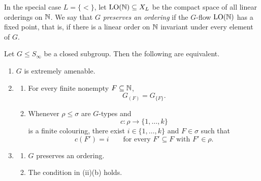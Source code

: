 In the special case \(L=\{<\}\), let \(\operatorname{LO}(\mathbb{N})\subseteq X_L\) be the compact space of all linear orderings on \(\mathbb{N}\). We say that \(G\) \emph{preserves an ordering} if the \(G\)-flow \(\operatorname{LO}(\mathbb{N})\) has a fixed point, that is, if there is a linear order on \(\mathbb{N}\) invariant under every element of \(G\).
\begin{proposition}
    \label{prop:type-characterization}
    Let \(G\leq S_\infty\) be a closed subgroup. Then the following are equivalent.
    \begin{enumerate}
        \item[(i)] \(G\) is extremely amenable.
        \item[(ii)]
              \begin{enumerate}
                  \item[(a)] For every finite nonempty \(F\subseteq\mathbb{N}\),
                        \[
                            G_{(F)}=G_{\{F\}}.
                        \]
                  \item[(b)] Whenever \(\rho\leq \sigma\) are \(G\)-types and
                        \[
                            c\colon \rho\to\{1,\dots,k\}
                        \]
                        is a finite colouring, there exist \(i\in\{1,\dots,k\}\) and \(F\in \sigma\) such that
                        \[
                            c(F')=i
                            \qquad\text{for every } F'\subseteq F \text{ with } F'\in \rho.
                        \]
              \end{enumerate}
        \item[(iii)]
              \begin{enumerate}
                  \item[(a')] \(G\) preserves an ordering.
                  \item[(b)] The condition in (ii)(b) holds.\end{enumerate}
    \end{enumerate}
\end{proposition}

